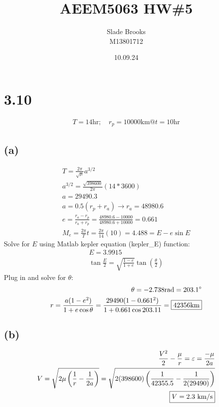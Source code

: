 \documentclass[12 pt]{article}
\title{AEEM5063 HW\#5}
\date{10.09.24}
\author{Slade Brooks \\ M13801712}
\begin{document}
\maketitle

\section*{3.10}
\begin{align*}
    T=14\textrm{hr};\quad r_p=10000\textrm{km} @ t=10\textrm{hr}
\end{align*}
\subsection*{(a)}
\begin{align*}
    T=\frac{2\pi}{\sqrt{\mu}}a^{3/2} \\
    a^{3/2}=\frac{\sqrt{398600}}{2\pi}(14*3600) \\
    a = 29490.3 \\
    a = 0.5(r_p+r_a) \rightarrow r_a=48980.6 \\
    e = \frac{r_a - r_p}{r_a+r_p}=\frac{48980.6-10000}{48980.6+10000}=0.661 \\
    M_e = \frac{2\pi}{T}t=\frac{2\pi}{14}(10)=4.488=E-e\sin{E}
\end{align*}
Solve for $E$ using Matlab kepler equation (kepler\_E) function:
\begin{align*}
    E = 3.9915 \\
    \tan{\frac{E}{2}}=\sqrt{\frac{1-e}{1+e}}\tan{\left(\frac{\theta}{2}\right)}
\end{align*}
Plug in and solve for $\theta$:
\begin{align*}
    \theta = -2.738\textrm{rad}=203.1^{\circ} \\
    r=\frac{a(1-e^2)}{1+e\cos{\theta}}=\frac{29490(1-0.661^2)}{1+0.661\cos{203.11}}=\fbox{$42356$km}
\end{align*}

\subsection*{(b)}
\begin{align*}
    \frac{V^2}{2}-\frac{\mu}{r}=\varepsilon=\frac{-\mu}{2a} \\
    V=\sqrt{2\mu\left(\frac{1}{r}-\frac{1}{2a}\right)}=\sqrt{2(398600)\left(\frac{1}{42355.5}-\frac{1}{2(29490)}\right)} \\
    \fbox{$V=2.3$ km/s}
\end{align*}
\end{document}
